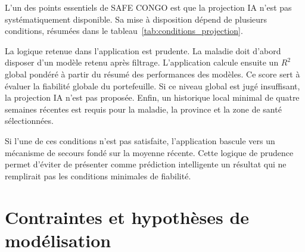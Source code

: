 L'un des points essentiels de SAFE CONGO est que la projection IA n'est pas systématiquement disponible. Sa mise à disposition dépend de plusieurs conditions, résumées dans le tableau~\ref{tab:conditions_projection}.

\begin{table}[H]
  \centering
  \caption{Conditions de disponibilité d'une projection IA dans SAFE CONGO}
  \label{tab:conditions_projection}
\end{table}

La logique retenue dans l'application est prudente. La maladie doit d'abord disposer d'un modèle retenu après filtrage. L'application calcule ensuite un $R^{2}$ global pondéré à partir du résumé des performances des modèles. Ce score sert à évaluer la fiabilité globale du portefeuille. Si ce niveau global est jugé insuffisant, la projection IA n'est pas proposée. Enfin, un historique local minimal de quatre semaines récentes est requis pour la maladie, la province et la zone de santé sélectionnées.

Si l'une de ces conditions n'est pas satisfaite, l'application bascule vers un mécanisme de secours fondé sur la moyenne récente. Cette logique de prudence permet d'éviter de présenter comme prédiction intelligente un résultat qui ne remplirait pas les conditions minimales de fiabilité.

\section{Contraintes et hypothèses de modélisation}

